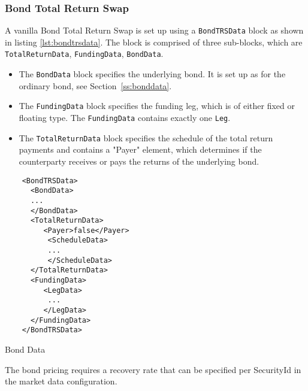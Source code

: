 \subsubsection{Bond Total Return Swap}
\label{ss:TRS}

A vanilla Bond Total Return Swap is set up using a {\tt BondTRSData} block as shown in listing \ref{lst:bondtrsdata}. The block is comprised of three sub-blocks, which
are {\tt TotalReturnData}, {\tt FundingData}, {\tt BondData}.

\begin{itemize}
\item The {\tt BondData} block specifies the underlying bond. It is set up as for the ordinary bond, see Section~\ref{ss:bonddata}.
\item The {\tt FundingData} block specifies the funding leg, which is of either fixed or floating type. The {\tt FundingData} contains exactly one {\tt Leg}.
\item The {\tt TotalReturnData} block specifies the schedule of the total return payments and contains a "Payer" element, which determines if the counterparty receives or pays the returns of the underlying bond.
\end{itemize}


\begin{listing}[H]
\begin{verbatim}
    <BondTRSData>
      <BondData>
      ...
      </BondData>
      <TotalReturnData>
         <Payer>false</Payer>
          <ScheduleData>
          ...
          </ScheduleData>
      </TotalReturnData>
      <FundingData>
         <LegData>
          ...
         </LegData>
      </FundingData>
    </BondTRSData>
\end{verbatim}
\caption{Bond Data}
\label{lst:bondtrsdata}
\end{listing}

The bond pricing requires a recovery rate that can be specified per SecurityId in the market data configuration.